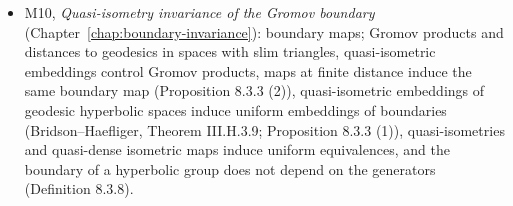 \begin{itemize}
        inequality on the boundary, bounded spaces have empty boundary (Example 8.3.5), and the
        boundary of $\Z$ has two points (Example 8.3.9).
  \item M10, \emph{Quasi-isometry invariance of the Gromov boundary}
        (Chapter~\ref{chap:boundary-invariance}): boundary maps; Gromov products and distances to
        geodesics in spaces with slim triangles, quasi-isometric embeddings control Gromov
        products, maps at finite distance induce the same boundary map (Proposition 8.3.3 (2)),
        quasi-isometric embeddings of geodesic hyperbolic spaces induce uniform embeddings of
        boundaries (Bridson--Haefliger, Theorem III.H.3.9; Proposition 8.3.3 (1)),
        quasi-isometries and quasi-dense isometric maps induce uniform equivalences, and the
        boundary of a hyperbolic group does not depend on the generators (Definition 8.3.8).
\end{itemize}











